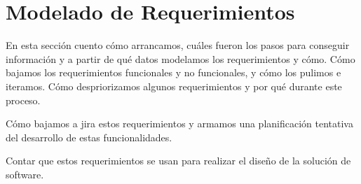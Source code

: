 \chapter[Modelado de Requerimientos]{Modelado de Requerimientos}
\label{cp:modelling}

\parindent0pt

En esta sección cuento cómo arrancamos, cuáles fueron los pasos para conseguir información y a partir de qué datos modelamos los requerimientos y cómo. Cómo bajamos los requerimientos funcionales y no funcionales, y cómo los pulimos e iteramos. Cómo despriorizamos algunos requerimientos y por qué durante este proceso.

Cómo bajamos a jira estos requerimientos y armamos una planificación tentativa del desarrollo de estas funcionalidades.

Contar que estos requerimientos se usan para realizar el diseño de la solución de software.
